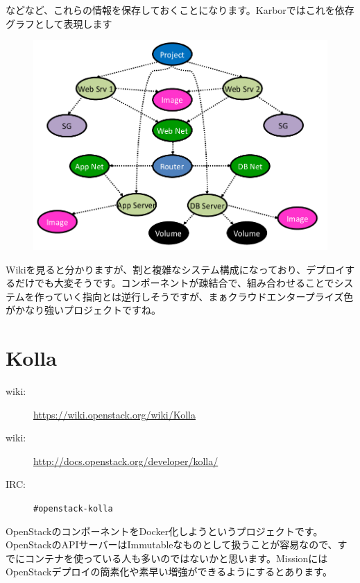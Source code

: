 などなど、これらの情報を保存しておくことになります。Karborではこれを依存グラフとして表現します

\begin{figure}[htb]
	\begin{center}
		\includegraphics[width=\textwidth]{img/Smaug-dependency-graph.png}
	\end{center}
\end{figure}

Wikiを見ると分かりますが、割と複雑なシステム構成になっており、デプロイするだけでも大変そうです。コンポーネントが疎結合で、組み合わせることでシステムを作っていく指向とは逆行しそうですが、まぁクラウドエンタープライズ色がかなり強いプロジェクトですね。

\section{Kolla}

\begin{description}
	\item[wiki:] \url{https://wiki.openstack.org/wiki/Kolla}
	\item[wiki:] \url{http://docs.openstack.org/developer/kolla/}
	\item[IRC:] \verb|#openstack-kolla|
\end{description}

OpenStackのコンポーネントをDocker化しようというプロジェクトです。OpenStackのAPIサーバーはImmutableなものとして扱うことが容易なので、すでにコンテナを使っている人も多いのではないかと思います。MissionにはOpenStackデプロイの簡素化や素早い増強ができるようにするとあります。

